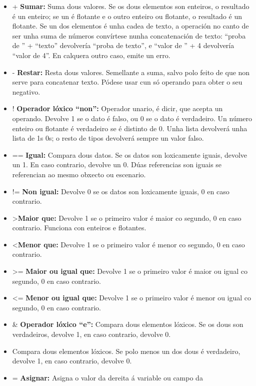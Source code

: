 \begin{itemize}
  \item + {\bf Sumar:} Suma dous valores. Se os dous elementos son enteiros, o
  resultado é un enteiro; se un é flotante e o outro enteiro ou flotante, o
  resultado é un flotante. Se un dos elementos é unha cadea de texto, a
  operación no canto de ser unha suma de números convírtese nunha concatenación
  de texto: ``proba de '' + ``texto'' devolvería ``proba de texto'', e ``valor
  de '' + 4 devolvería ``valor de 4''. En calquera outro caso, emite un erro.
  \item - {\bf Restar:} Resta dous valores. Semellante a suma, salvo polo feito
  de que non serve para concatenar texto. Pódese usar cun só operando para obter
  o seu negativo.
  \item ! {\bf Operador lóxico ``non'':} Operador unario, é dicir, que acepta un
  operando. Devolve 1 se o dato é falso, ou 0 se o dato é verdadeiro. Un número
  enteiro ou flotante é verdadeiro se é distinto de 0. Unha lista devolverá unha
  lista de 1s  0s; o resto de tipos devolverá sempre un valor falso.
  \item == {\bf Igual:} Compara dous datos. Se os datos son loxicamente iguais,
  devolve un 1. En caso contrario, devolve un 0. Dúas referencias son iguais se
  referencian ao mesmo obxecto ou escenario.
  \item != {\bf Non igual:} Devolve 0 se os datos son loxicamente iguais, 0 en
  caso contrario.
  \item \textgreater {\bf Maior que:} Devolve 1 se o primeiro valor é maior co
  segundo, 0 en caso contrario. Funciona con enteiros e flotantes.
  \item \textless {\bf Menor que:} Devolve 1 se o primeiro valor é menor co
  segundo, 0 en caso contrario.
  \item \textgreater= {\bf Maior ou igual que:} Devolve 1 se o primeiro valor é maior ou
  igual co segundo, 0 en caso contrario.
  \item \textless= {\bf Menor ou igual que:} Devolve 1 se o primeiro valor é
  menor ou igual co segundo, 0 en caso contrario.
  \item \& {\bf Operador lóxico ``e'':} Compara dous elementos lóxicos. Se os
  dous son verdadeiros, devolve 1, en caso contrario, devolve 0.
  \item {} Compara dous elementos lóxicos.
  Se polo menos un dos dous é verdadeiro, devolve 1, en caso contrario, devolve
  0.
  \item = {\bf Asignar:} Asigna o valor da dereita á variable ou campo da

\end{itemize}
